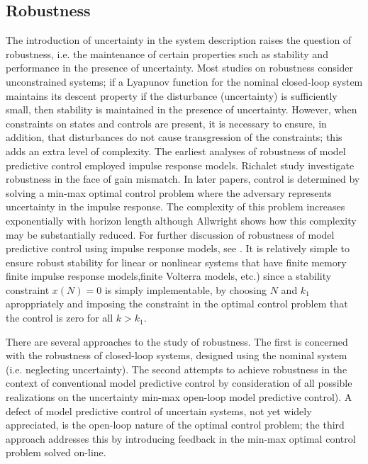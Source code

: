 \subsection{Robustness}
\noindent The introduction of uncertainty in the system description raises the question of robustness, i.e. the maintenance of certain properties such as stability and performance in the presence of uncertainty. Most studies on robustness consider unconstrained systems; if a Lyapunov function for the nominal closed-loop system maintains its descent property if the disturbance (uncertainty) is sufficiently small, then stability is maintained in the presence of uncertainty. However, when constraints on states and controls are present, it is necessary to ensure, in addition, that disturbances do not cause transgression of the constraints; this adds an extra level of complexity. The earliest analyses of robustness of model predictive control employed impulse response models. Richalet study \cite{richalet1978model} investigate robustness in the face of gain mismatch. In later papers, control is determined by solving a min-max optimal control problem where the adversary represents uncertainty in the impulse response. The complexity of this problem increases exponentially with horizon length although Allwright \cite{allwright1993min} shows how this complexity may be substantially reduced. For further discussion of robustness of model predictive control using impulse response models, see \cite{zheng1993robust,genceli1993robust,de1996robustness}. It is relatively simple to ensure robust stability for linear or nonlinear systems that have finite memory finite impulse response models,finite Volterra models, etc.) since a stability constraint $x(N)=0$ is simply implementable, by choosing $N$ and $k_1$ aproppriately and imposing the constraint in the optimal control problem that the control is zero for all $k > k_1$.

There are several approaches to the study of robustness. The first is concerned with the robustness of closed-loop systems, designed using the nominal system (i.e. neglecting uncertainty). The second attempts to achieve robustness in the context of conventional model predictive control by consideration of all possible realizations on the uncertainty min-max open-loop model predictive control). A defect of model predictive control of uncertain systems, not yet widely appreciated, is the open-loop nature of the optimal control problem; the third approach addresses this by introducing feedback in the min-max optimal control problem solved on-line. 

